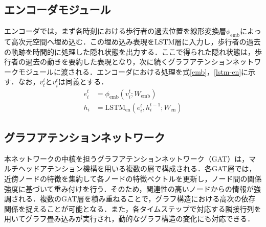 \vspace{-30pt}

\subsection{エンコーダモジュール}
エンコーダでは，まず各時刻における歩行者の過去位置を線形変換層$\phi_{\text{emb}}$によって高次元空間へ埋め込む．この埋め込み表現をLSTM層に入力し，歩行者の過去の軌跡を時間的に処理した隠れ状態を出力する．ここで得られた隠れ状態は，歩行者の過去の動きを要約した表現となり，次に続くグラフアテンションネットワークモジュールに渡される．エンコーダにおける処理を式\eqref{emb}，\eqref{lstm-en}に示す．なお，$v^i_t \text{と} v^t_i$は同義とする．
\begin{align}
  e^t_i &= \phi_{\text{emb}}(v^t_i ; W_{\text{emb}}) \label{emb} \\
  h_i &= \text{LSTM}_{\text{en}}(e^t_i, h^{t-1}_i ; W_{\text{en}}) \label{lstm-en}
\end{align}

\vspace{-17pt}

\subsection{グラフアテンションネットワーク}
本ネットワークの中核を担うグラフアテンションネットワーク（GAT）\cite{velickovic2017graph-gat}は，マルチヘッドアテンション機構を用いる複数の層で構成される．各GAT層では，近傍ノードの特徴を集約して各ノードの特徴ベクトルを更新し，ノード間の関係強度に基づいて重み付けを行う．そのため，関連性の高いノードからの情報が強調される．複数のGAT層を積み重ねることで，グラフ構造における高次の依存関係を捉えることが可能となる．また，各タイムステップで対応する隣接行列を用いてグラフ畳み込みが実行され，動的なグラフ構造の変化にも対応できる．



